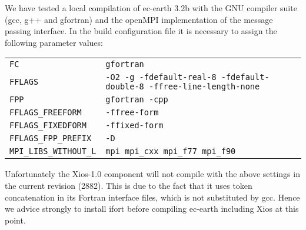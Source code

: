 We have tested a local compilation of ec-earth 3.2b with the GNU compiler suite (gcc, g++ and gfortran) and the openMPI implementation of the message passing interface. In the build configuration file it is necessary to assign the following parameter values:
\begin{center}
\begin{tabular}{ll}
\texttt{FC}&\texttt{gfortran}\\
\texttt{FFLAGS}&\texttt{-O2 -g -fdefault-real-8 -fdefault-double-8 -ffree-line-length-none}\\
\texttt{FPP}&\texttt{gfortran -cpp}\\
\texttt{FFLAGS\_FREEFORM}&\texttt{-ffree-form}\\
\texttt{FFLAGS\_FIXEDFORM}&\texttt{-ffixed-form}\\
\texttt{FFLAGS\_FPP\_PREFIX}&\texttt{-D}\\
\texttt{MPI\_LIBS\_WITHOUT\_L}&\texttt{mpi mpi\_cxx mpi\_f77 mpi\_f90}\\
\end{tabular}
\end{center}
Unfortunately the Xios-1.0 component will not compile with the above settings in the current revision (2882). This is due to the fact that it uses token concatenation in its Fortran interface files, which is not substituted by gcc. Hence we advice strongly to install ifort before compiling ec-earth including Xios at this point. 

